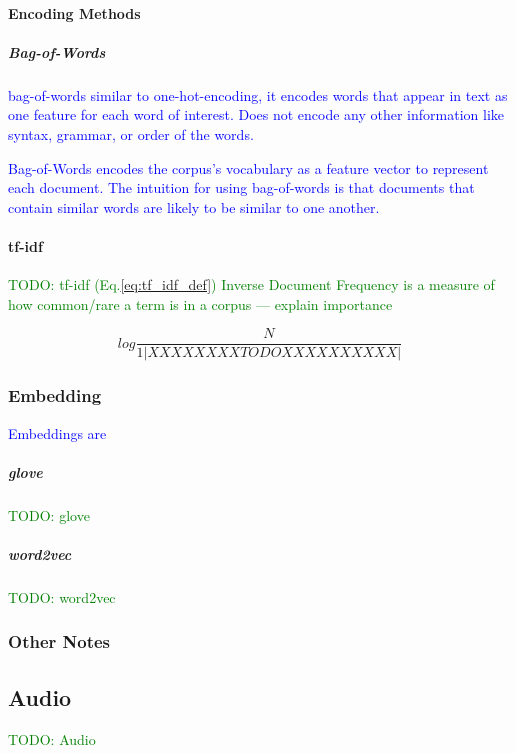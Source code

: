 \paragraph{Encoding Methods}

\subparagraph{Bag-of-Words}

\textcolor{blue}{{bag-of-words} similar to one-hot-encoding, it encodes words that appear in text as one feature for each word of interest. Does not encode any other information like syntax, grammar, or order of the words.}

\textcolor{blue}{Bag-of-Words encodes the corpus's vocabulary as a feature vector to represent each document. The intuition for using bag-of-words is that documents that contain similar words are likely to be similar to one another.}


\paragraph{tf-idf}

\textcolor{green}{TODO: tf-idf (Eq.\ref{eq:tf_idf_def}) Inverse Document Frequency is a measure of how common/rare a term is in a corpus --- explain importance}

\begin{equation}
{log\frac{N}{1|XXXXXXXXTODOXXXXXXXXXX|}}
\label{eq:tf_idf_def}
\end{equation}

\subsubsection{Embedding}





\textcolor{blue}{Embeddings are }

\subparagraph{glove}

\textcolor{green}{TODO: glove}

\subparagraph{word2vec}

\textcolor{green}{TODO: word2vec}

\subsubsection{Other Notes}


\subsection{Audio}


\textcolor{green}{TODO: Audio}
